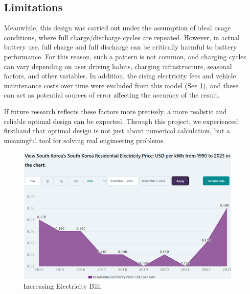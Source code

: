 \documentclass[11pt,twocolumn]{article}
\begin{document}
        \subsection{Limitations}
            Meanwhile, this design was carried out under the assumption of ideal usage conditions, where full charge/discharge cycles are repeated.
            However, in actual battery use, full charge and full discharge can be critically harmful to battery performance.
            For this reason, such a pattern is not common, and charging cycles can vary depending on user driving habits, charging infrastructure, seasonal factors, and other variables.
            In addition, the rising electricity fees and vehicle maintenance costs over time were excluded from this model (See \cref{bill}), and these can act as potential sources of error affecting the accuracy of the result.
            \par
            If future research reflects these factors more precisely, a more realistic and reliable optimal design can be expected.
            Through this project, we experienced firsthand that optimal design is not just about numerical calculation, but a meaningful tool for solving real engineering problems.
            \begin{figure}[h]
                \centering
                \includegraphics[width=0.8\columnwidth]{bill.png}
                \caption{Increasing Electricity Bill.}
                \label{bill}
            \end{figure}
    \printbibliography
\end{document}
